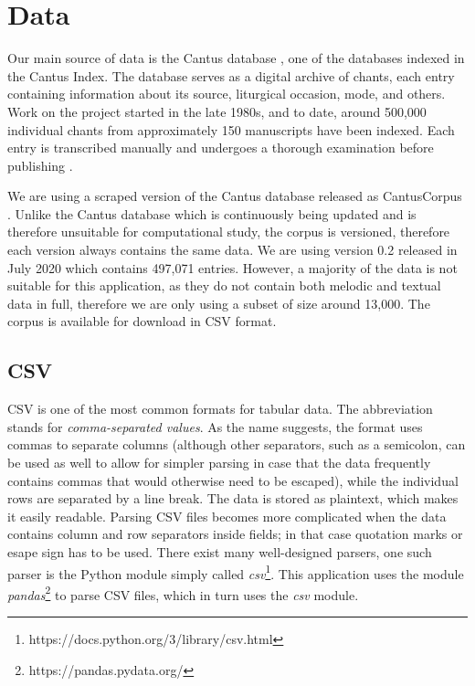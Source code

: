 \chapter{Data}

Our main source of data is the Cantus database \citep{cantus_db}, one of the databases indexed in the Cantus Index. The database serves as a 
digital archive of chants, each entry containing information about its source, liturgical occasion, mode, and others. Work on the project started
in the late 1980s, and to date, around 500,000 individual chants from approximately 150 manuscripts have been indexed. Each entry is transcribed 
manually and undergoes a thorough examination before publishing \citep{cantus_lacoste}.

We are using a scraped version of the Cantus database released as CantusCorpus \citep{chant21}. Unlike the Cantus database which is continuously being
updated and is therefore unsuitable for computational study, the corpus is versioned, therefore each version always contains the same data. We are using
version 0.2 released in July 2020 which contains 497,071 entries. However, a majority of the data is not suitable for this application, as they do not
contain both melodic and textual data in full, therefore we are only using a subset of size around 13,000. The corpus is available for download in CSV format.

\section{CSV}

CSV is one of the most common formats for tabular data. The abbreviation stands for \emph{comma-separated values}. As the name suggests, the format
uses commas to separate columns (although other separators, such as a semicolon, can be used as well to allow for simpler parsing in case that the data 
frequently contains commas that would otherwise need to be escaped), while the individual rows are separated by a line break. The data is stored as plaintext,
which makes it easily readable. Parsing CSV files becomes more complicated when the data contains column and row separators inside fields; in that case
quotation marks or esape sign has to be used. There exist many well-designed parsers, one such parser is the Python module simply called \emph{csv}\footnote{https://docs.python.org/3/library/csv.html}.
This application uses the module \emph{pandas}\footnote{https://pandas.pydata.org/} to parse CSV files, which in turn uses the \emph{csv} module.

